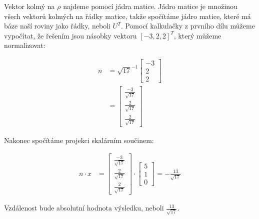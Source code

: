 \documentclass{article}
\begin{document}
Vektor kolmý na $\rho$ najdeme pomocí jádra matice. Jádro matice je množinou všech vektorů kolmých na řádky matice, takže spočítáme jádro matice, které má báze naší roviny jako řádky, neboli $U^T$. Pomocí kalkulačky z prvního dílu můžeme vypočítat, že řešením jsou násobky vektoru $\left[-3, 2, 2\right]^T$, který můžeme normalizovat:

\begin{align*}
    n & = \sqrt{17}^{-1}
    \begin{bmatrix}
        -3 \\ 2 \\ 2
    \end{bmatrix}                         \\
      & = \begin{bmatrix}
              \frac{-3}{\sqrt{17}} \\
              \frac{2}{\sqrt{17}}  \\
              \frac{2}{\sqrt{17}}
          \end{bmatrix}
\end{align*}

Nakonec spočítáme projekci skalárním součinem:

\begin{align*}
    n \cdot x & =
    \begin{bmatrix}
        \frac{-3}{\sqrt{17}} \\
        \frac{2}{\sqrt{17}}  \\
        \frac{2}{\sqrt{17}}
    \end{bmatrix}
    \cdot
    \begin{bmatrix}
        5 \\ 1 \\ 0
    \end{bmatrix}
    = -\frac{13}{\sqrt{17}}
\end{align*}

Vzdálenost bude absolutní hodnota výsledku, neboli $\frac{13}{\sqrt{17}}$.
\end{document}
